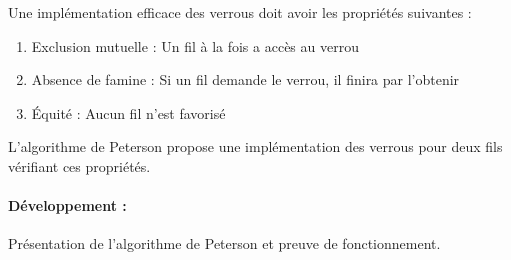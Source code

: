 Une implémentation efficace des verrous doit avoir les propriétés suivantes : \begin{enumerate} 
	\item Exclusion mutuelle : Un fil à la fois a accès au verrou
	\item Absence de famine : Si un fil demande le verrou, il finira par l'obtenir
	\item Équité : Aucun fil n'est favorisé 
\end{enumerate}

\begin{algo}
	L'algorithme de Peterson propose une implémentation des verrous pour deux fils vérifiant ces propriétés.
\end{algo}

\paragraph{Développement :} Présentation de l'algorithme de Peterson et preuve de fonctionnement.

